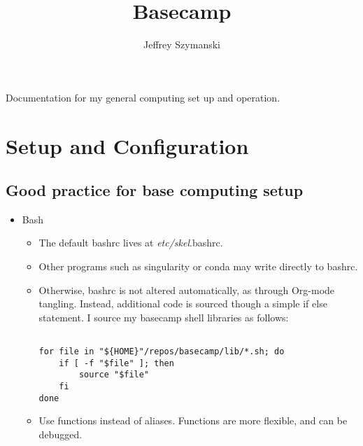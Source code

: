 \documentclass{article}
\author{Jeffrey Szymanski}
\date{}
\title{Basecamp}
\begin{document}
\maketitle
Documentation for my general computing set up and operation.

\section*{Setup and Configuration}
\label{sec:orga918e3e}
\subsection*{Good practice for base computing setup}
\label{sec:org15cd8b4}
\begin{itemize}
\item Bash
\label{sec:orgd22dbf5}

\begin{itemize}
\item The default bashrc lives at \emph{etc/skel}.bashrc.
\item Other programs such as singularity or conda may write directly to bashrc.
\item Otherwise, bashrc is not altered automatically, as through Org-mode tangling. Instead, additional code is sourced though a simple if else statement. I source my basecamp shell libraries as follows:

\begin{verbatim}

for file in "${HOME}"/repos/basecamp/lib/*.sh; do
    if [ -f "$file" ]; then
        source "$file"
    fi
done

\end{verbatim}

\item Use functions instead of aliases. Functions are more flexible, and can be debugged.
\end{itemize}
\end{itemize}
\end{document}
